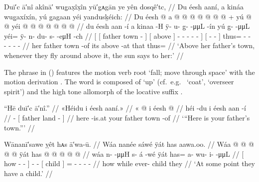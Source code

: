 \ex\label{ex:89-61-fly-around-sun-says}%
%
\begingl
	\glpreamble	Duī′c ā′nî akînā′ wug̣ax̣îx̣în yū′g̣ᴀgān ye yên dosqê′tc, //
	\glpreamble	Du éesh aaní, a kináa wug̱axíxín, yú g̱agaan yéi yandusḵéich: //
	\gla	{} {} Du éesh  @ {} {}
			{} a  @ {} {}
			 @ {} @ {} @ {} @ {} @ {} @ {} {} +
		{} yú  @ {} @ {} {}
		yéi @  @ {} @ {} @ {} @ {} @ {} @ {} //
	\glb	{} {} du éesh aan -í {}
			{} a kinaa -H {}
			ÿ- u- {} g̱-  -μμL -ín {}
		{} yú g̱-  -μμL {}
		yéi= ÿ- n- du- s-  -eμH -ch //
	\glc	{}[ {}[  father town - {}]
			{}[  above \· {}]
			- - \· -  - - {}]
		{}[  -  - {}]
		thus= - - - -  - - //
	\gld	{} {} her father town -of {}
			{} its above -at {}
			 {} {} {} {} {} {} {}
		{} that  {} {} {}
		thus=  {} {} {} {} {} {} //
	\glft	‘Above her father’s town, whenever they fly around above it, the sun says to her:’
		//
\endgl
\xe

The phrase  in (\lastx) features the motion verb root  ‘fall; move through space’ with the motion derivation .
The word  is composed of  ‘up’ (cf.\ e.g.\  ‘coat’,  ‘overseer spirit’) and the high tone  allomorph of the locative suffix .

\ex\label{ex:89-62-heres-your-fathers-town}%
%
\begingl
	\glpreamble	“Hē duī′c ā′nî.” //
	\glpreamble	«\!Héidu i éesh aaní.\!» //
	\gla	«\! @ {}
		{} i éesh  @ {} {} //
	\glb	\pqp{}héi -du
		{} i éesh aan -í {} //
	\glc	\pqp{} -
		{}[  father land - {}] //
	\gld	\pqp{}here -is.at
		{} your father town -of {} //
	\glft	‘“Here is your father’s town.”’
		//
\endgl
\xe

\ex\label{ex:89-63-have-a-child}%
%
\begingl
	\glpreamble	Wānanī′sawe ỵêt hᴀs ā′wa-ū. //
	\glpreamble	Wáa nanée sáwé ÿát has aawa.oo. //
	\gla	{} Wáa  @ {} @ {} @ {} {}  @ {} @ {}
		{} ÿát {} has @  @ {} @ {} @ {} @ {} //
	\glb	{} wáa n-  -μμH {} {} s- á -wé
		{} ÿát {} has= a- wu- i-  -μμL //
	\glc	{}[ how -  - \· {}] -  -
		{}[ child {}] = - - -  - //
	\gld	{} how  {} {} \·while {} ever-  {} 
		{} child {} they  //
	\glft	‘At some point they have a child.’
		//
\endgl
\xe

